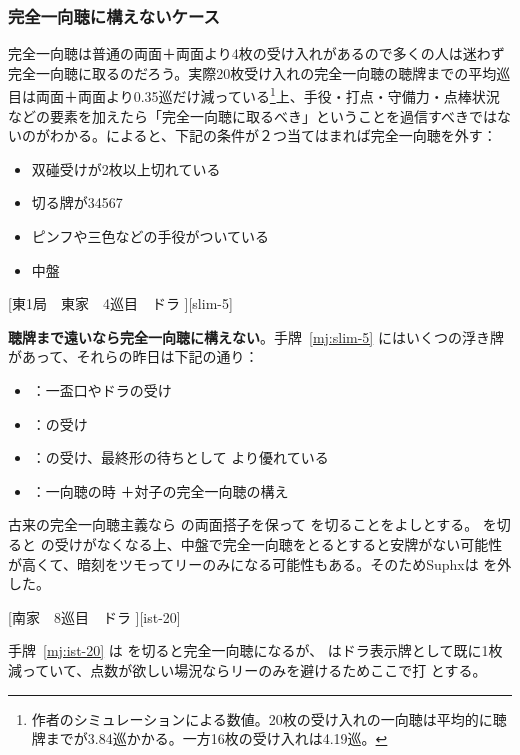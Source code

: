 \documentclass[../nankiru_main.tex]{subfiles}
\begin{document}
\subsubsection*{完全一向聴に構えないケース}

完全一向聴は普通の両面＋両面より4枚の受け入れがあるので多くの人は迷わず完全一向聴に取るのだろう。実際20枚受け入れの完全一向聴の聴牌までの平均巡目は両面＋両面より0.35巡だけ減っている\footnote{作者のシミュレーションによる数値。20枚の受け入れの一向聴は平均的に聴牌までが3.84巡かかる。一方16枚の受け入れは4.19巡。}上、手役・打点・守備力・点棒状況などの要素を加えたら「完全一向聴に取るべき」ということを過信すべきではないのがわかる。\citet[]{yuusee-complete-ist}によると、下記の条件が２つ当てはまれば完全一向聴を外す：

\begin{itemize}
\item 双碰受けが2枚以上切れている
\item 切る牌が34567
\item ピンフや三色などの手役がついている
\item 中盤
\end{itemize}

[東1局　東家　4巡目　ドラ ][slim-5]

\textbf{聴牌まで遠いなら完全一向聴に構えない}\citep[][pp.~214--215]{suphx}。手牌~\ref{mj:slim-5} にはいくつの浮き牌があって、それらの昨日は下記の通り：

\begin{itemize}
\item {}：一盃口やドラの受け
\item {}：の受け
\item {}：の受け、最終形の待ちとして  より優れている
\item {}：一向聴の時  ＋対子の完全一向聴の構え
\end{itemize}

古来の完全一向聴主義なら  の両面搭子を保って  を切ることをよしとする。 を切ると  の受けがなくなる上、中盤で完全一向聴をとるとすると安牌がない可能性が高くて、暗刻をツモってリーのみになる可能性もある。そのためSuphxは  を外した。

[南家　8巡目　ドラ ][ist-20]

手牌~\ref{mj:ist-20} は  を切ると完全一向聴になるが、 はドラ表示牌として既に1枚減っていて、点数が欲しい場況ならリーのみを避けるためここで打  とする\citep[][p. 19]{ishibashi-black}。
\end{document}
